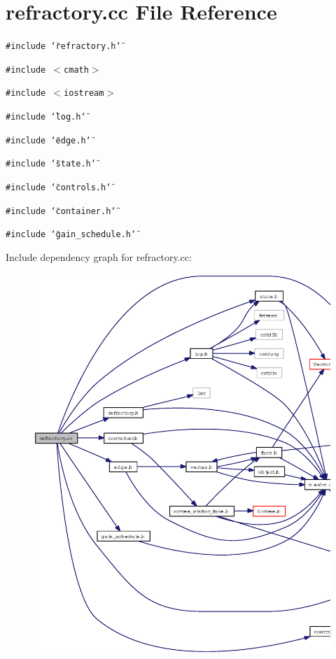 \section{refractory.cc File Reference}
\label{refractory_8cc}
{\tt \#include \char`\"{}refractory.h\char`\"{}}\par
{\tt \#include $<$cmath$>$}\par
{\tt \#include $<$iostream$>$}\par
{\tt \#include \char`\"{}log.h\char`\"{}}\par
{\tt \#include \char`\"{}edge.h\char`\"{}}\par
{\tt \#include \char`\"{}state.h\char`\"{}}\par
{\tt \#include \char`\"{}controls.h\char`\"{}}\par
{\tt \#include \char`\"{}container.h\char`\"{}}\par
{\tt \#include \char`\"{}gain\_\-schedule.h\char`\"{}}\par


Include dependency graph for refractory.cc:\begin{figure}[H]
\begin{center}
\leavevmode
\includegraphics[width=381pt]{refractory_8cc__incl}
\end{center}
\end{figure}
